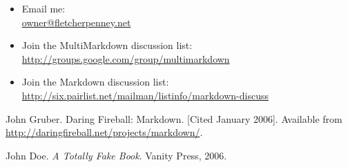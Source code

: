 \begin{itemize}
\item Email me:\\
\href{mailto:owner@fletcherpenney.net}{owner@fletcherpenney.net}

\item Join the MultiMarkdown discussion list:\\
\href{http://groups.google.com/group/multimarkdown}{http:/\slash groups.google.com\slash group\slash multimarkdown}

\item Join the Markdown discussion list:\\
\href{http://six.pairlist.net/mailman/listinfo/markdown-discuss}{http:/\slash six.pairlist.net\slash mailman\slash listinfo\slash markdown-discuss}

\end{itemize}

\begin{thebibliography}{0}

John Gruber. Daring Fireball: Markdown. [Cited January 2006].
 Available from \href{http://daringfireball.net/projects/markdown/}{http:/\slash daringfireball.net\slash projects\slash markdown\slash }.


John Doe. \emph{A Totally Fake Book}. Vanity Press, 2006.


\end{thebibliography}




